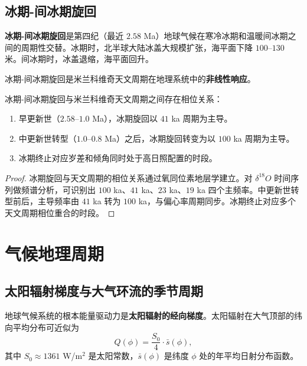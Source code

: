 \subsection{冰期-间冰期旋回}

\begin{definition}[冰期-间冰期旋回]\label{def:glacial_interglacial_cycles}
\textbf{冰期-间冰期旋回}是第四纪（最近 $2.58$ Ma）地球气候在寒冷冰期和温暖间冰期之间的周期性交替。冰期时，北半球大陆冰盖大规模扩张，海平面下降 $100$--$130$ 米。间冰期时，冰盖退缩，海平面回升。

冰期-间冰期旋回是米兰科维奇天文周期在地理系统中的\textbf{非线性响应}。
\end{definition}

\begin{proposition}[冰期旋回的相位关系]\label{prop:glacial_phase_locking}
冰期-间冰期旋回与米兰科维奇天文周期之间存在相位关系：
\begin{enumerate}[label=(\roman*)]
    \item 早更新世（$2.58$--$1.0$ Ma），冰期旋回以 $41$ ka 周期为主导。
    \item 中更新世转型（$1.0$--$0.8$ Ma）之后，冰期旋回转变为以 $100$ ka 周期为主导。
    \item 冰期终止对应岁差和倾角同时处于高日照配置的时段。
\end{enumerate}
\end{proposition}

\begin{proof}
冰期旋回与天文周期的相位关系通过氧同位素地层学建立。对 $\delta^{18}O$ 时间序列做频谱分析，可识别出 $100$ ka、$41$ ka、$23$ ka、$19$ ka 四个主频率。中更新世转型前后，主导频率由 $41$ ka 转为 $100$ ka，与偏心率周期同步。冰期终止对应多个天文周期相位重合的时段。
\end{proof}

\section{气候地理周期}
\label{sec:climate_geographic_cycles}

\subsection{太阳辐射梯度与大气环流的季节周期}

\begin{definition}[太阳辐射的经向梯度]\label{def:solar_insolation_gradient}
地球气候系统的根本能量驱动力是\textbf{太阳辐射的经向梯度}。太阳辐射在大气顶部的纬向平均分布可近似为
\[
Q(\phi)=\frac{S_0}{4}\cdot\bar{s}(\phi),
\]
其中 $S_0\approx 1361$ W/m$^2$ 是太阳常数，$\bar{s}(\phi)$ 是纬度 $\phi$ 处的年平均日射分布函数。
\end{definition}

